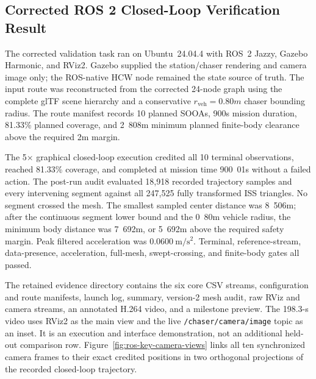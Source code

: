 \subsection{Corrected ROS 2 Closed-Loop Verification Result}
\label{sec:ros-verification-results}

The corrected validation task ran on Ubuntu~24.04.4 with ROS~2 Jazzy,
Gazebo Harmonic, and RViz2. Gazebo supplied the station/chaser rendering and
camera image only; the ROS-native HCW node remained the state source of truth.
The input route was reconstructed from the corrected 24-node graph using the
complete glTF scene hierarchy and a conservative
$r_{\mathrm{veh}}=\unit{0.80}{m}$ chaser bounding radius. The route manifest
records 10 planned SOOAs, \unit{900}{s} mission duration, 81.33\% planned
coverage, and \unit{2.808}{m} minimum planned finite-body clearance above the
required \unit{2}{m} margin.

The 5$\times$ graphical closed-loop execution credited all 10 terminal
observations, reached 81.33\% coverage, and completed at mission time
\unit{900.01}{s} without a failed action. The post-run audit evaluated 18,918
recorded trajectory samples and every intervening segment against all 247,525
fully transformed ISS triangles. No segment crossed the mesh. The smallest
sampled center distance was \unit{8.506}{m}; after the continuous segment lower
bound and the \unit{0.80}{m} vehicle radius, the minimum body distance was
\unit{7.692}{m}, or \unit{5.692}{m} above the required safety margin. Peak
filtered acceleration was $0.0600~\mathrm{m/s^2}$. Terminal, reference-stream,
data-presence, acceleration, full-mesh, swept-crossing, and finite-body gates
all passed.

The retained evidence directory contains the six core CSV streams,
configuration and route manifests, launch log, summary, version-2 mesh audit,
raw RViz and camera streams, an annotated H.264 video, and a milestone preview.
The 198.3-s video uses RViz2 as the main view and the live
\texttt{/chaser/camera/image} topic as an inset. It is an execution and
interface demonstration, not an additional held-out comparison row.
Figure~\ref{fig:ros-key-camera-views} links all ten synchronized camera frames
to their exact credited positions in two orthogonal projections of the recorded
closed-loop trajectory.

